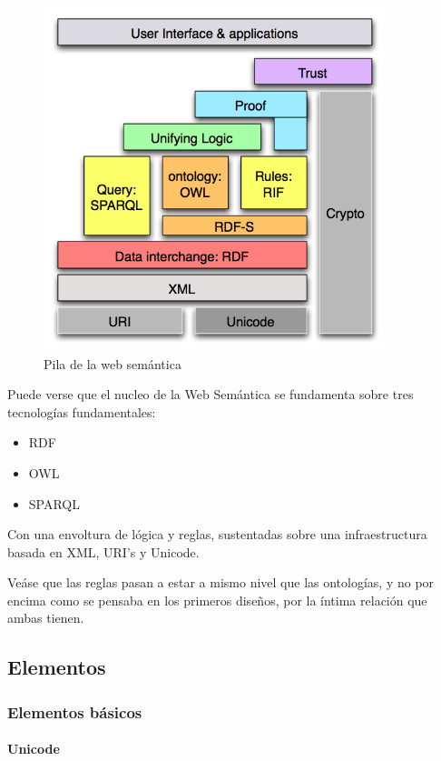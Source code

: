 \begin{figure}[H]
	\centering
	\includegraphics[width=10cm]{images/semantic-web-stack.png}
	\caption{Pila de la web semántica}
	\label{fig:swStack}
\end{figure}

Puede verse que el nucleo de la Web Semántica se fundamenta sobre tres 
tecnologías fundamentales:

\begin{itemize}
  \item RDF
  \item OWL
  \item SPARQL
\end{itemize}

Con una envoltura de lógica y reglas, sustentadas sobre una infraestructura 
basada en XML, URI's y Unicode.

Veáse que las reglas pasan a estar a mismo nivel que las ontologías, y no por
encima como se pensaba en los primeros diseños, por la íntima relación que ambas
tienen.

\subsection{Elementos}

\subsubsection{Elementos básicos}

\paragraph{Unicode}

